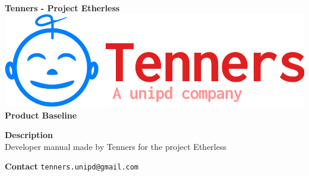 \begin{titlepage}
	\begin{center}
		\large \textbf{Tenners - Project Etherless}
		\vfill
		\includegraphics[scale = 0.3]{./res/img/logo.png}\\
		\vfill
		\Huge \textbf{Product Baseline}

        \vfill
        \large

                \vfill
                \normalsize
                \vfill
                                \textbf{Description}
                \\Developer manual made by Tenners for the project Etherless
                \vfill
                \normalsize
                \vfill
                
                \textbf{Contact}
                \texttt{tenners.unipd@gmail.com}

	\end{center}
\end{titlepage}
